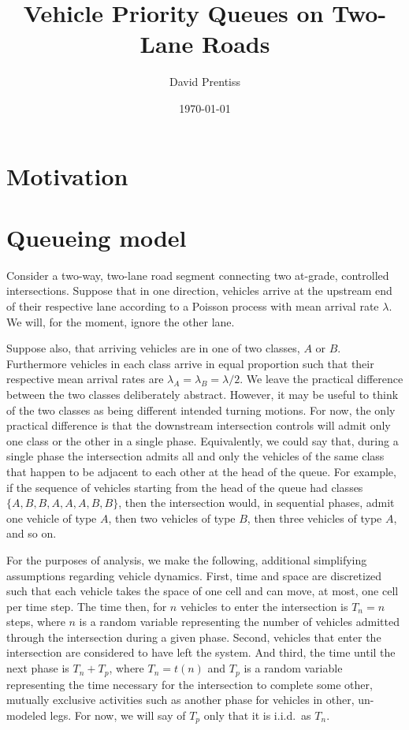 \documentclass{amsart}
\begin{document}
\title{Vehicle Priority Queues on Two-Lane Roads}
\author{David Prentiss}
\date{\today}
\maketitle
\section{Motivation}

\cite{Prentiss2020}
\cite{Levin2019a}
\cite{LeVine2016a}
\cite{Dresner2004}

\section{Queueing model}
Consider a two-way, two-lane road segment connecting two at-grade, controlled
intersections. Suppose that in one direction, vehicles arrive at the upstream
end of their respective lane according to a Poisson process with mean arrival
rate $\lambda$. We will, for the moment, ignore the other lane.

Suppose also, that arriving vehicles are in one of two classes, $A$ or $B$.
Furthermore vehicles in each class arrive in equal proportion such that their
respective mean arrival rates are $\lambda_A=\lambda_B=\lambda/2$. We leave the
practical difference between the two classes deliberately abstract. However, it
may be useful to think of the two classes as being different intended turning
motions. For now, the only practical difference is that the downstream
intersection controls will admit only one class or the other in a single phase.
Equivalently, we could say that, during a single phase the intersection admits
all and only the vehicles of the same class that happen to be adjacent to each
other at the head of the queue. For example, if the sequence of vehicles
starting from the head of the queue had classes $\{A,B,B,A,A,A,B,B\}$, then the
intersection would, in sequential phases, admit one vehicle of type $A$, then
two vehicles of type $B$, then three vehicles of type $A$, and so on.

For the purposes of analysis, we make the following, additional simplifying
assumptions regarding vehicle dynamics. First, time and space are discretized
such that each vehicle takes the space of one cell and can move, at most, one
cell per time step. The time then, for $n$ vehicles to enter the intersection is
$T_n=n$ steps, where $n$ is a random variable representing the number of
vehicles admitted through the intersection during a given phase. Second,
vehicles that enter the intersection are considered to have left the system. And
third, the time until the next phase is $T_n+T_p$, where $T_n = t(n)$ and $T_p$
is a random variable representing the time necessary for the intersection to
complete some other, mutually exclusive activities such as another phase for
vehicles in other, un-modeled legs. For now, we will say of $T_p$ only that it
is i.i.d.\ as $T_n$.
\end{document}
